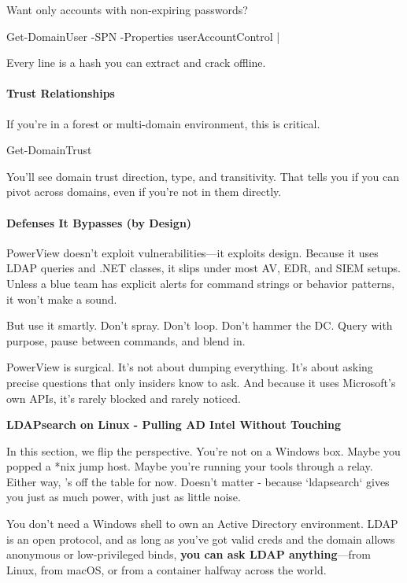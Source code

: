 Want only accounts with non-expiring passwords?

Get-DomainUser -SPN -Properties userAccountControl |

Every line is a hash you can extract and crack offline.

\paragraph{   Trust Relationships}

If you’re in a forest or multi-domain environment, this is critical.

Get-DomainTrust

You’ll see domain trust direction, type, and transitivity. That tells you if you can pivot across domains, even if you’re not in them directly.

\paragraph{\textbf{Defenses It Bypasses (by Design)}}

PowerView doesn’t exploit vulnerabilities—it exploits design. Because it uses LDAP queries and .NET classes, it slips under most AV, EDR, and SIEM setups. Unless a blue team has explicit alerts for command strings or behavior patterns, it won’t make a sound.

But use it smartly. Don’t spray. Don’t loop. Don’t hammer the DC. Query with purpose, pause between commands, and blend in.

PowerView is surgical. It’s not about dumping everything. It’s about asking precise questions that only insiders know to ask. And because it uses Microsoft’s own APIs, it’s rarely blocked and rarely noticed.

\textbf{LDAPsearch on Linux - Pulling AD Intel Without Touching  }

In this section, we flip the perspective. You’re not on a Windows box. Maybe you popped a *nix jump host. Maybe you’re running your tools through a relay. Either way,  ’s off the table for now. Doesn’t matter - because `ldapsearch` gives you just as much power, with just as little noise.

You don’t need a Windows shell to own an Active Directory environment. LDAP is an open protocol, and as long as you’ve got valid creds and the domain allows anonymous or low-privileged binds, \textbf{you can ask LDAP anything}—from Linux, from macOS, or from a container halfway across the world.

